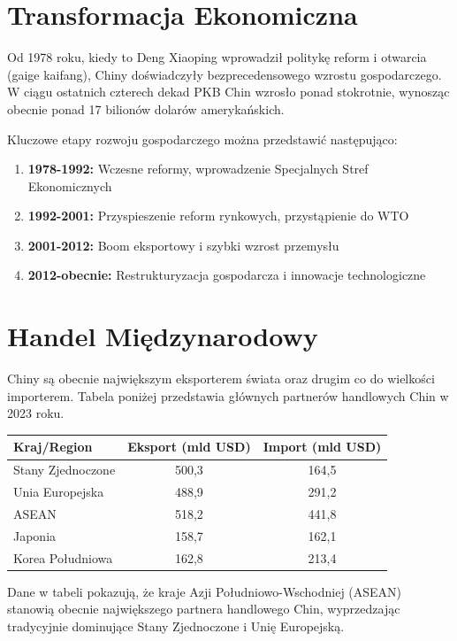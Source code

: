 \documentclass[12pt,a4paper]{report}
\begin{document}
\section{Transformacja Ekonomiczna}

Od 1978 roku, kiedy to Deng Xiaoping wprowadził politykę reform i otwarcia (gaige kaifang), Chiny doświadczyły bezprecedensowego wzrostu gospodarczego. W ciągu ostatnich czterech dekad PKB Chin wzrosło ponad stokrotnie, wynosząc obecnie ponad 17 bilionów dolarów amerykańskich.

Kluczowe etapy rozwoju gospodarczego można przedstawić następująco:
\begin{enumerate}
\item \textbf{1978-1992:} Wczesne reformy, wprowadzenie Specjalnych Stref Ekonomicznych
\item \textbf{1992-2001:} Przyspieszenie reform rynkowych, przystąpienie do WTO
\item \textbf{2001-2012:} Boom eksportowy i szybki wzrost przemysłu
\item \textbf{2012-obecnie:} Restrukturyzacja gospodarcza i innowacje technologiczne
\end{enumerate}

\section{Handel Międzynarodowy}

Chiny są obecnie największym eksporterem świata oraz drugim co do wielkości importerem. Tabela poniżej przedstawia głównych partnerów handlowych Chin w 2023 roku.

\begin{table}[h]
\centering
\begin{tabular}{@{}lcc@{}}
\toprule
\textbf{Kraj/Region} & \textbf{Eksport (mld USD)} & \textbf{Import (mld USD)} \\ \midrule
Stany Zjednoczone & 500,3 & 164,5 \\
Unia Europejska & 488,9 & 291,2 \\
ASEAN & 518,2 & 441,8 \\
Japonia & 158,7 & 162,1 \\
Korea Południowa & 162,8 & 213,4 \\ \bottomrule
\end{tabular}
\end{table}

Dane w tabeli pokazują, że kraje Azji Południowo-Wschodniej (ASEAN) stanowią obecnie największego partnera handlowego Chin, wyprzedzając tradycyjnie dominujące Stany Zjednoczone i Unię Europejską.
\end{document}

